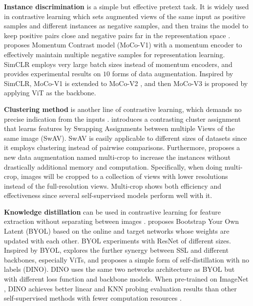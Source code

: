 \documentclass[10pt,twocolumn,letterpaper]{article}
\begin{document}
\textbf{Instance discrimination} \cite{dosovitskiy2014discriminative} is a simple but effective pretext task.
It is widely used in contrastive learning which sets augmented views of the same input as positive samples and different instances as negative samples, and then trains the model to keep positive pairs close and negative pairs far in the representation space \cite{dosovitskiy2014discriminative,wu2018unsupervised, tian2020makes,seneviratne2021self}.
\cite{he2020momentum} proposes Momentum Contrast model (MoCo-V1) with a momentum encoder to effectively maintain multiple negative samples for representation learning.
SimCLR \cite{chen2020simple} employs very large batch sizes instead of momentum encoders, and provides experimental results on $10$ forms of data augmentation.
Inspired by SimCLR, MoCo-V1 is extended to MoCo-V2 \cite{chen2020improved}, and then MoCo-V3 \cite{chen2021empirical} is proposed by applying ViT as the backbone.

\textbf{Clustering method} is another line of contrastive learning, which demands no precise indication from the inputs \cite{caron2018deep}. 
\cite{caron2020unsupervised} introduces a contrasting cluster assignment that learns features by Swapping Assignments between multiple Views of the same image (SwAV).
SwAV is easily applicable to different sizes of datasets since it employs clustering instead of pairwise comparisons.
Furthermore, \cite{caron2020unsupervised} proposes a new data augmentation named multi-crop to increase the instances without drastically additional memory and computation.  
Specifically, when doing multi-crop, images will be cropped to a collection of views with lower resolutions instead of the full-resolution views.
Multi-crop shows both efficiency and effectiveness since several self-supervised models \cite{caron2018deep,asano2019self,chen2020simple} perform well with it.



\textbf{Knowledge distillation} can be used in contrastive learning for feature extraction without separating between images \cite{caron2021emerging}.
\cite{grill2020bootstrap} proposes Bootstrap Your Own Latent (BYOL) based on the online and target networks whose weights are updated with each other.
BYOL experiments with ResNet of different sizes.
Inspired by BYOL, \cite{caron2021emerging} explores the further synergy between SSL and different backbones, especially ViTs, and proposes a simple form of self-distillation with no labels (DINO).
DINO uses the same two networks architecture as BYOL but with different loss function and backbone models.
When pre-trained on ImageNet \cite{russakovsky2015imagenet}, DINO achieves better linear and KNN probing evaluation results than other self-supervised methods with fewer computation resources \cite{grill2020bootstrap,caron2020unsupervised,caron2021emerging}.
\end{document}
